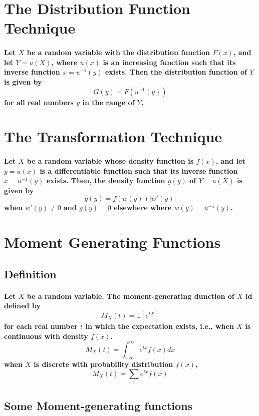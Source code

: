 \documentclass[titlepage]{article}
\begin{document}
    \section{The Distribution Function Technique}
            \paragraph{
                Let $X$ be a random variable with the distribution function $F(x)$, and let $Y=u(X)$, where $u(x)$ is an increasing function such that its inverse function $x=u^{-1}(y)$ exists. Then the distribution function of $Y$ is given by 
                $$G(y)=F(u^{-1}(y))$$
                for all real numbers $y$ in the range of $Y$.
            }
    \section{The Transformation Technique}
        \paragraph{
            Let $X$ be a random variable whose density function is $f(x)$, and let $y=u(x)$ is a differentiable function such that its inverse function $x=u^{-1}(y)$ exists. Then, the density function $g(y)$ of $Y=u(X)$ is given by 
            $$g(y)=f(w(y))|w'(y)|$$ when $w'(y)\neq 0$ 
            and $g(y)=0$ elsewhere where $w(y)=u^{-1}(y)$.
        }
    \section{Moment Generating Functions}
        \subsection*{Definition}
            \paragraph{
                Let $X$ be a random variable. The moment-generating dunction of $X$ id defined by 
                $$M_X(t)=\mathbb{E}[e^{tX}]$$
                for each real number $t$ in which the expectation exists, i.e., when $X$ is continuous with density $f(x)$.
                $$M_X(t)=\int_{-\infty}^\infty e^{tx}f(x)dx$$
                when $X$ is discrete with probability distribution $f(x)$,
                $$M_X(t)=\sum_xe^{tx}f(x)$$
            }
        \subsection{Some Moment-generating functions}
\end{document}
